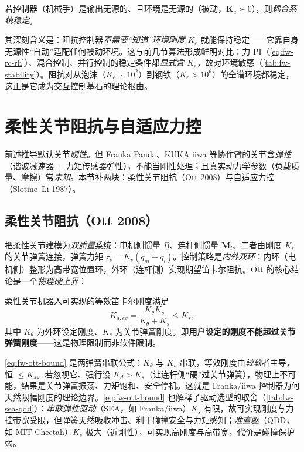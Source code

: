 \begin{theorem}
\label{thm:fw-colgate}
若控制器（机械手）是输出无源的、且环境是无源的（被动，$\mathbf{K}_e\succ0$），则\emph{耦合系统稳定}\cite{colgate1988robust}。
\end{theorem}

其深刻含义是：阻抗控制器\emph{不需要“知道”环境刚度} $K_e$ 就能保持稳定——它靠自身无源性“自动”适配任何被动环境。这与前几节算法形成鲜明对比：力 PI（\cref{eq:fw-rc-rh}）、混合控制、并行控制的稳定条件都\emph{显式含} $K_e$，故对环境敏感（\cref{tab:fw-stability}）。阻抗对从泡沫（$K_e\!\sim\!10^2$）到钢铁（$K_e\!>\!10^6$）的全谱环境都稳定，这正是它成为交互控制基石的理论根由。

\section{柔性关节阻抗与自适应力控}
\label{sec:fw-flex-adaptive}

前述推导默认关节\emph{刚性}。但 Franka Panda、KUKA iiwa 等协作臂的关节含\emph{弹性}（谐波减速器 + 力矩传感器弹性），不能当刚性处理；且真实动力学参数（负载质量、摩擦）常\emph{未知}。本节补两块：柔性关节阻抗（Ott 2008）与自适应力控（Slotine--Li 1987）。

\subsection{柔性关节阻抗（Ott 2008）}
\label{sec:fw-flex}

把柔性关节建模为\emph{双质量}系统：电机侧惯量 $B$、连杆侧惯量 $\mathbf{M}_l$、二者由刚度 $K_s$ 的关节弹簧连接，弹簧力矩 $\tau_s=K_s(q_m-q_l)$。控制策略是\emph{内外双环}：内环（电机侧）整形为高带宽位置环，外环（连杆侧）实现期望笛卡尔阻抗。Ott 的核心结论是一个\emph{物理硬上界}：

\begin{theorem}[等效笛卡尔刚度上界]
\label{thm:fw-ott}
柔性关节机器人可实现的等效笛卡尔刚度满足
\begin{equation}
  K_{d,eq}=\frac{K_\theta K_s}{K_\theta+K_s}\le K_s,
  \label{eq:fw-ott-bound}
\end{equation}
其中 $K_\theta$ 为外环设定刚度、$K_s$ 为关节弹簧刚度\cite{ott2008cartesian,ott2008unified}。即\textbf{用户设定的刚度不能超过关节弹簧刚度}——这是物理限制而非软件限制。
\end{theorem}

\cref{eq:fw-ott-bound} 是两弹簧串联公式：$K_\theta$ 与 $K_s$ 串联，等效刚度由\emph{较软}者主导，恒 $\le K_s$。若忽视它、强行设 $K_d>K_s$（让连杆侧“硬”过关节弹簧），物理上不可能，结果是关节弹簧振荡、力矩饱和、安全停机。这就是 Franka/iiwa 控制器为何天然限幅刚度的理论边界。\cref{eq:fw-ott-bound} 也解释了驱动选型的取舍（\cref{tab:fw-sea-qdd}）：\emph{串联弹性驱动}（SEA，如 Franka/iiwa）$K_s$ 有限，故可实现刚度与力控带宽受限，但弹簧天然吸收冲击、利于碰撞安全与力矩感知；\emph{准直驱}（QDD，如 MIT Cheetah）$K_s$ 极大（近刚性），可实现高刚度与高带宽，代价是碰撞保护弱。

